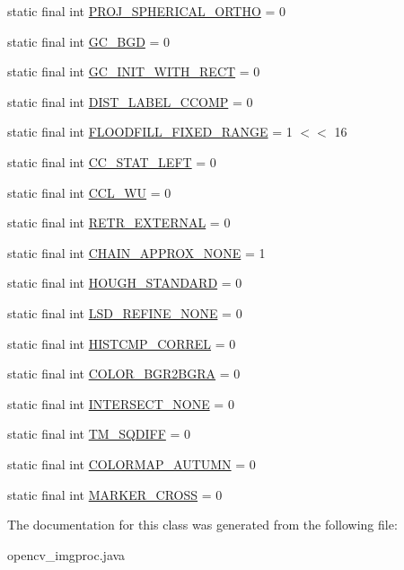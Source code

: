 \begin{DoxyCompactItemize}
\item 
static final int \hyperlink{group__imgproc__misc_ga019454ab3c5354908ba3f6ee474b67c7}{P\+R\+O\+J\+\_\+\+S\+P\+H\+E\+R\+I\+C\+A\+L\+\_\+\+O\+R\+T\+HO} = 0
\item 
static final int \hyperlink{group__imgproc__misc_gac0bdeb696070291d0e46d38bc031fe24}{G\+C\+\_\+\+B\+GD} = 0
\item 
static final int \hyperlink{group__imgproc__misc_ga524c8be4a39fddefb7b373e70f87751b}{G\+C\+\_\+\+I\+N\+I\+T\+\_\+\+W\+I\+T\+H\+\_\+\+R\+E\+CT} = 0
\item 
static final int \hyperlink{group__imgproc__misc_ga5df0759a4f8c3ca100ff1c8acc20f41e}{D\+I\+S\+T\+\_\+\+L\+A\+B\+E\+L\+\_\+\+C\+C\+O\+MP} = 0
\item 
static final int \hyperlink{group__imgproc__misc_gaf99f7c0156c9c4cca823004e9534ba96}{F\+L\+O\+O\+D\+F\+I\+L\+L\+\_\+\+F\+I\+X\+E\+D\+\_\+\+R\+A\+N\+GE} = 1 $<$$<$ 16
\item 
static final int \hyperlink{group__imgproc__shape_ga349952fcbf280ca92c36978312c607a6}{C\+C\+\_\+\+S\+T\+A\+T\+\_\+\+L\+E\+FT} = 0
\item 
static final int \hyperlink{group__imgproc__shape_ga9b0d3771ada15612aef51a25db60c21f}{C\+C\+L\+\_\+\+WU} = 0
\item 
static final int \hyperlink{group__imgproc__shape_ga94d7307a24949485303f94d555fd31c8}{R\+E\+T\+R\+\_\+\+E\+X\+T\+E\+R\+N\+AL} = 0
\item 
static final int \hyperlink{group__imgproc__shape_ga2e9681fae693a35abe17e8f4265acdbf}{C\+H\+A\+I\+N\+\_\+\+A\+P\+P\+R\+O\+X\+\_\+\+N\+O\+NE} = 1
\item 
static final int \hyperlink{group__imgproc_ga8a1f49c921b5f1321db39c707417054d}{H\+O\+U\+G\+H\+\_\+\+S\+T\+A\+N\+D\+A\+RD} = 0
\item 
static final int \hyperlink{group__imgproc__feature_ga878ecf12ede1cbc57e30e4e700c8385d}{L\+S\+D\+\_\+\+R\+E\+F\+I\+N\+E\+\_\+\+N\+O\+NE} = 0
\item 
static final int \hyperlink{group__imgproc__hist_ga191607eeab47aa090f1b49b4e1198f6a}{H\+I\+S\+T\+C\+M\+P\+\_\+\+C\+O\+R\+R\+EL} = 0
\item 
static final int \hyperlink{group__imgproc__misc_ga42b2263bdd1223c126d6102a1afc9cf4}{C\+O\+L\+O\+R\+\_\+\+B\+G\+R2\+B\+G\+RA} = 0
\item 
static final int \hyperlink{group__imgproc__shape_gae1ca9924d0a73e52ad45f660cc2160e4}{I\+N\+T\+E\+R\+S\+E\+C\+T\+\_\+\+N\+O\+NE} = 0
\item 
static final int \hyperlink{group__imgproc__object_ga715306af5ab35ada7a80b4af7b0eb0c3}{T\+M\+\_\+\+S\+Q\+D\+I\+FF} = 0
\item 
static final int \hyperlink{group__imgproc__colormap_ga2dc59cecee33f4918f54902eae297e0c}{C\+O\+L\+O\+R\+M\+A\+P\+\_\+\+A\+U\+T\+U\+MN} = 0
\item 
static final int \hyperlink{group__imgproc__draw_gad3b5af2fc44e8c67ac0c7f607d59d724}{M\+A\+R\+K\+E\+R\+\_\+\+C\+R\+O\+SS} = 0
\end{DoxyCompactItemize}


The documentation for this class was generated from the following file\+:\begin{DoxyCompactItemize}
\item 
opencv\+\_\+imgproc.\+java\end{DoxyCompactItemize}
